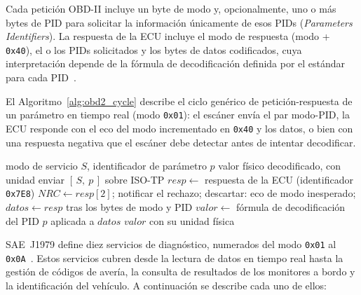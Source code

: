 Cada petición OBD-II incluye un byte de modo y, opcionalmente, uno o más bytes de PID para solicitar la información únicamente de esos PIDs (\textit{Parameters Identifiers}). La respuesta de la ECU incluye el modo de respuesta (modo + \texttt{0x40}), el o los PIDs solicitados y los bytes de datos codificados, cuya interpretación depende de la fórmula de decodificación definida por el estándar para cada PID~\cite{SAEJ1979:2014}.

El Algoritmo~\ref{alg:obd2_cycle} describe el ciclo genérico de petición-respuesta de un parámetro en tiempo real (modo \texttt{0x01}): el escáner envía el par modo-PID, la ECU responde con el eco del modo incrementado en \texttt{0x40} y los datos, o bien con una respuesta negativa que el escáner debe detectar antes de intentar decodificar.

\begin{algorithm}[H]
\caption{Ciclo de petición-respuesta de un parámetro OBD-II (SAE~J1979).}
\label{alg:obd2_cycle}
\begin{algorithmic}[1]
\Require modo de servicio $S$, identificador de parámetro $p$
\Ensure valor físico decodificado, con unidad
\State enviar $[\,S,\ p\,]$ sobre ISO-TP 
\State $resp \gets$ respuesta de la ECU (identificador \texttt{0x7E8})
 
    \State $NRC \gets resp[2]$; notificar el rechazo; \Return
{}
    \State descartar: eco de modo inesperado; \Return
\EndIf
\State $datos \gets resp$ tras los bytes de modo y PID
\State $valor \gets$ fórmula de decodificación del PID $p$ aplicada a $datos$
\State \Return $valor$ con su unidad física
\end{algorithmic}
\end{algorithm}

\vspace{1cm}

SAE~J1979 define diez servicios de diagnóstico, numerados del modo \texttt{0x01} al \texttt{0x0A}~\cite{SAEJ1979:2014}. Estos servicios cubren desde la lectura de datos en tiempo real hasta la gestión de códigos de avería, la consulta de resultados de los monitores a bordo y la identificación del vehículo. A continuación se describe cada uno de ellos:

